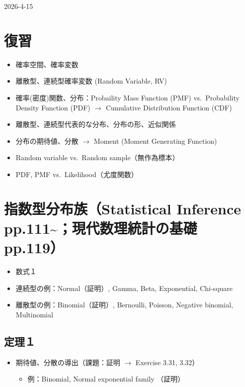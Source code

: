 \documentclass[
]{book}
\providecommand{\tightlist}{%
  \setlength{\itemsep}{0pt}\setlength{\parskip}{0pt}}
\begin{document}
2026-4-15

\section*{復習}\label{ux5fa9ux7fd2}

\begin{itemize}
\tightlist
\item
  確率空間、確率変数
\item
  離散型、連続型確率変数 (Random Variable, RV)
\item
  確率(密度)関数、分布：Probaility Mass Function (PMF) vs.~Probability Density Function (PDF) \(\rightarrow\) Cumulative Distribution Function (CDF)
\item
  離散型、連続型代表的な分布、分布の形、近似関係
\item
  分布の期待値、分散 \(\rightarrow\) Moment (Moment Generating Function)
\item
  Random variable vs.~Random sample（無作為標本）
\item
  PDF, PMF vs.~Likelihood（尤度関数）
\end{itemize}

\section{指数型分布族（Statistical Inference pp.111\textasciitilde；現代数理統計の基礎 pp.119）}\label{ux6307ux6570ux578bux5206ux5e03ux65cfstatistical-inference-pp.111ux73feux4ee3ux6570ux7406ux7d71ux8a08ux306eux57faux790e-pp.119}

\begin{itemize}
\tightlist
\item
  数式１
\item
  連続型の例：Normal（証明）, Gamma, Beta, Exponential, Chi-square
\item
  離散型の例：Binomial（証明）, Bernoulli, Poisson, Negative binomial, Multinomial
\end{itemize}

\subsection{定理１}\label{ux5b9aux7406uxff11}

\begin{itemize}
\tightlist
\item
  期待値、分散の導出（課題：証明 \(\rightarrow\) Exercise 3.31, 3.32）

  \begin{itemize}
  \tightlist
  \item
    例：Binomial, Normal exponential family （証明）
  \end{itemize}
\end{itemize}
\end{document}
